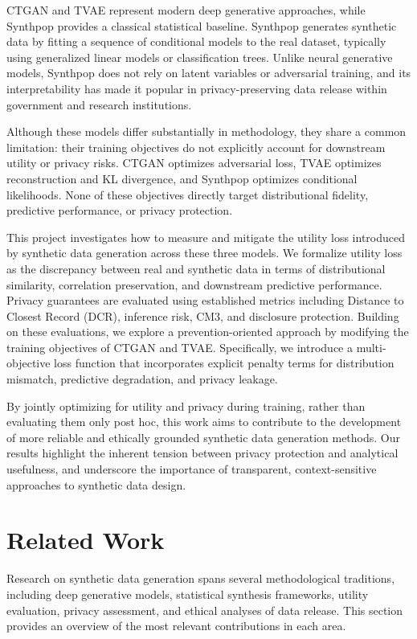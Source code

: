 \documentclass[11pt]{article}
\begin{document}
CTGAN and TVAE represent modern deep generative approaches, while Synthpop provides a classical statistical baseline. Synthpop generates synthetic data by fitting a sequence of conditional models to the real dataset, typically using generalized linear models or classification trees. Unlike neural generative models, Synthpop does not rely on latent variables or adversarial training, and its interpretability has made it popular in privacy-preserving data release within government and research institutions.

Although these models differ substantially in methodology, they share a common limitation: their training objectives do not explicitly account for downstream utility or privacy risks. CTGAN optimizes adversarial loss, TVAE optimizes reconstruction and KL divergence, and Synthpop optimizes conditional likelihoods. None of these objectives directly target distributional fidelity, predictive performance, or privacy protection.

This project investigates how to measure and mitigate the utility loss introduced by synthetic data generation across these three models. We formalize utility loss as the discrepancy between real and synthetic data in terms of distributional similarity, correlation preservation, and downstream predictive performance. Privacy guarantees are evaluated using established metrics including Distance to Closest Record (DCR), inference risk, CM3, and disclosure protection. Building on these evaluations, we explore a prevention-oriented approach by modifying the training objectives of CTGAN and TVAE. Specifically, we introduce a multi-objective loss function that incorporates explicit penalty terms for distribution mismatch, predictive degradation, and privacy leakage.

By jointly optimizing for utility and privacy during training, rather than evaluating them only post hoc, this work aims to contribute to the development of more reliable and ethically grounded synthetic data generation methods. Our results highlight the inherent tension between privacy protection and analytical usefulness, and underscore the importance of transparent, context-sensitive approaches to synthetic data design.


\section{Related Work}

Research on synthetic data generation spans several methodological traditions, including deep generative models, statistical synthesis frameworks, utility evaluation, privacy assessment, and ethical analyses of data release. This section provides an overview of the most relevant contributions in each area.
\end{document}
